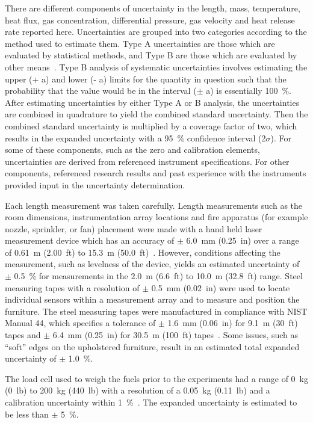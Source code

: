 \documentclass[12pt,oneside]{book}
\begin{document}
There are different components of uncertainty in the length, mass, temperature, heat flux, gas concentration, differential pressure, gas velocity and heat release rate reported here. Uncertainties are grouped into two categories according to the method used to estimate them. Type A uncertainties are those which are evaluated by statistical methods, and Type B are those which are evaluated by other means~\cite{Taylor&Kuyatt:1994}. Type B analysis of systematic uncertainties involves estimating the upper (+ a) and lower (- a) limits for the quantity in question such that the probability that the value would be in the interval ($\pm$ a) is essentially 100~\%. After estimating uncertainties by either Type A or B analysis, the uncertainties are combined in quadrature to yield the combined standard uncertainty. Then the combined standard uncertainty is multiplied by a coverage factor of two, which results in the expanded uncertainty with a 95~\% confidence interval (2$\sigma$).  For some of these components, such as the zero and calibration elements, uncertainties are derived from referenced instrument specifications. For other components, referenced research results and past experience with the instruments provided input in the uncertainty determination.

Each length measurement was taken carefully. Length measurements such as the room dimensions, instrumentation array locations and fire apparatus (for example nozzle, sprinkler, or fan) placement were made with a hand held laser measurement device which has an accuracy of $\pm$ 6.0~mm (0.25~in) over a range of 0.61~m (2.00~ft) to 15.3~m (50.0~ft)~\cite{StanleyTools}. However, conditions affecting the measurement, such as levelness of the device, yields an estimated uncertainty of $\pm$ 0.5~\% for measurements in the 2.0~m (6.6~ft) to 10.0~m (32.8~ft) range.  Steel measuring tapes with a resolution of  $\pm$ 0.5~mm (0.02~in) were used to locate individual sensors within a measurement array and to measure and position the furniture. The steel measuring tapes were manufactured in compliance with NIST Manual 44, which specifies a tolerance of $\pm$ 1.6~mm (0.06~in) for 9.1~m (30~ft) tapes and $\pm$ 6.4~mm (0.25~in) for 30.5~m (100~ft) tapes~\cite{Butcher:2012}. Some issues, such as ``soft'' edges on the upholstered furniture, result in an estimated total expanded uncertainty of $\pm$ 1.0~\%.

The load cell used to weigh the fuels prior to the experiments had a range of 0~kg (0~lb) to 200~kg (440~lb) with a resolution of a 0.05~kg (0.11~lb) and a calibration uncertainty within 1~\%~\cite{Ohaus:2000}. The expanded uncertainty is estimated to be less than $\pm$ 5~\%.
\end{document}
